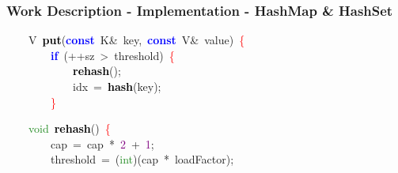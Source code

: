 \documentclass[table, usenames,dvipsnames,svgnames]{beamer}
\begin{document}
\begin{frame}

\frametitle{Work Description - Implementation - HashMap \& HashSet}




\pause
\vspace{-4mm}
\begin{center}\begin{minipage}{90mm}
\begin{block}
\noindent
\mbox{}\ \ \ \ \textcolor{TealBlue}{V}\ \textbf{\textcolor{Black}{put}}\textcolor{BrickRed}{(}\textbf{\textcolor{Blue}{const}}\ K\textcolor{BrickRed}{\&}\ key\textcolor{BrickRed}{,}\ \textbf{\textcolor{Blue}{const}}\ V\textcolor{BrickRed}{\&}\ value\textcolor{BrickRed}{)}\ \textcolor{Red}{\{} \\
\mbox{}\ \ \ \ \ \ \ \ \textbf{\textcolor{Blue}{if}}\ \textcolor{BrickRed}{(++}sz\ \textcolor{BrickRed}{\textgreater{}}\ threshold\textcolor{BrickRed}{)}\ \textcolor{Red}{\{} \\
\mbox{}\ \ \ \ \ \ \ \ \ \ \ \ \textbf{\textcolor{Black}{rehash}}\textcolor{BrickRed}{();} \\
\mbox{}\ \ \ \ \ \ \ \ \ \ \ \ idx\ \textcolor{BrickRed}{=}\ \textbf{\textcolor{Black}{hash}}\textcolor{BrickRed}{(}key\textcolor{BrickRed}{);} \\
\mbox{}\ \ \ \ \ \ \ \ \textcolor{Red}{\}} \\
\end{block}
\end{minipage}\end{center}

\pause
\vspace{-6mm}
\begin{center}\begin{minipage}{90mm}
\begin{block}
\noindent
\mbox{}\ \ \ \ \textcolor{ForestGreen}{void}\ \textbf{\textcolor{Black}{rehash}}\textcolor{BrickRed}{()}\ \textcolor{Red}{\{} \\
\mbox{}\ \ \ \ \ \ \ \ cap\ \textcolor{BrickRed}{=}\ cap\ \textcolor{BrickRed}{*}\ \textcolor{Purple}{2}\ \textcolor{BrickRed}{+}\ \textcolor{Purple}{1}\textcolor{BrickRed}{;} \\
\mbox{}\ \ \ \ \ \ \ \ threshold\ \textcolor{BrickRed}{=}\ \textcolor{BrickRed}{(}\textcolor{ForestGreen}{int}\textcolor{BrickRed}{)(}cap\ \textcolor{BrickRed}{*}\ loadFactor\textcolor{BrickRed}{);} \\
\end{block}
\end{minipage}\end{center}


\end{frame}
\end{document}
